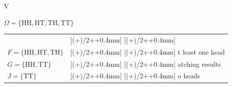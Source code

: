 \documentclass{article}
\newcommand{\DefinitionFont}{\fontsize{13}{15}\selectfont}
\newcommand{\SymbolFont}{\fontsize{14}{16}\selectfont}
\newcommand{\ExampleFont}{\fontsize{12.8}{14.8}\selectfont}
\newlength{\RowPadding}
\newcommand{\paddedcell}[1]{\centeredcell{#1}}
\newcommand{\centeredtextcolumn}[1]{p{#1}}
\newcommand{\contextcell}[1]{%
  \sbox{\CellContent}{#1}%
  \raisebox{\dimexpr(\dp\CellContent-\ht\CellContent)/2\relax}{\usebox{\CellContent}}}
\newcommand{\centeredcell}[1]{%
  \sbox{\CellContent}{\begin{minipage}[t]{\linewidth}\raggedright #1\end{minipage}}%
  \raisebox{\dimexpr(\dp\CellContent-\ht\CellContent)/2\relax}%
    [\dimexpr(\ht\CellContent+\dp\CellContent)/2+\RowPadding+0.4mm\relax]%
    [\dimexpr(\ht\CellContent+\dp\CellContent)/2+\RowPadding+0.4mm\relax]%
    {\usebox{\CellContent}}%
}
\newcommand{\ExampleLineStretch}{1.12}
\newcommand{\meaningexplanation}[1]{\textcolor{gray}{\textit{#1}}}
\newcommand{\conceptmeaning}[2]{\begingroup
  #1\par #2\rule[-1pt]{0pt}{1pt}\par
  \endgroup}
\newlength{\ExampleWidth}
\newcommand{\subrowcell}[1]{\begingroup
  \setlength{\RowPadding}{0pt}\centeredcell{#1}\endgroup}
\begin{document}
{\begin{minipage}{\dimexpr\linewidth-2\fboxsep-2\fboxrule\relax}
{\begin{tabular}{V}
\begin{minipage}[t]{\ExampleWidth}
  $\Omega=\{\mathrm{HH},\mathrm{HT},\mathrm{TH},\mathrm{TT}\}$\par
  \begingroup
  \let\tabularxcolumn\centeredtextcolumn
  \begin{tabularx}{\linewidth}{@{}>{\collectcell\contextcell}l<{\endcollectcell}>{\collectcell\subrowcell}X<{\endcollectcell}@{}}
  \textbf{Symbol / event set}&\textbf{Meaning}\\
  $F=\{\mathrm{HH},\mathrm{HT},\mathrm{TH}\}$&At least one head\\
  $G=\{\mathrm{HH},\mathrm{TT}\}$&Matching results\\
  $J=\{\mathrm{TT}\}$&No heads
  \end{tabularx}\endgroup
  \end{minipage}
  \end{tabular}}\par
  \end{minipage}}\par
\endgroup
\vspace{0.7mm}
\setlength{\RowPadding}{0.15mm}
\renewcommand{\arraystretch}{1}
\renewcommand{\ExampleLineStretch}{1.02}
\newcommand{\probrow}[5]{%
  \paddedcell{\centering\SymbolFont\ensuremath{\displaystyle #1}}&%
  \paddedcell{\DefinitionFont\conceptmeaning{\if\relax\detokenize{#2}\relax\else#2:\fi}{\meaningexplanation{#3}}}&%
  \paddedcell{\ExampleFont #4}&\paddedcell{\ExampleFont #5}\\\hline}
\end{document}

